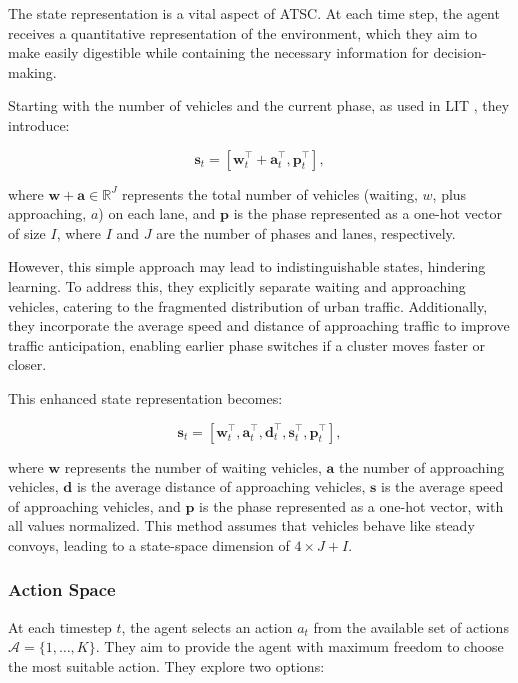 The state representation is a vital aspect of ATSC. At each time step, the agent receives a quantitative representation of the environment, which they aim to make easily digestible while containing the necessary information for decision-making.

Starting with the number of vehicles and the current phase, as used in LIT \cite{zheng2019diagnosing}, they introduce:

\[
\boldsymbol{s}_t = [ \boldsymbol{w}_t^\intercal + \boldsymbol{a}_t^\intercal , \boldsymbol{p}_t^\intercal ] ,
\]

where \(\boldsymbol{w} + \boldsymbol{a} \in \mathbb{R}^J\) represents the total number of vehicles (waiting, \(w\), plus approaching, \(a\)) on each lane, and \(\boldsymbol{p}\) is the phase represented as a one-hot vector of size \(I\), where \(I\) and \(J\) are the number of phases and lanes, respectively.

However, this simple approach may lead to indistinguishable states, hindering learning. To address this, they explicitly separate waiting and approaching vehicles, catering to the fragmented distribution of urban traffic. Additionally, they incorporate the average speed and distance of approaching traffic to improve traffic anticipation, enabling earlier phase switches if a cluster moves faster or closer.

This enhanced state representation becomes:

\[
\boldsymbol{s}_t = [\boldsymbol{w}_t^\intercal, \boldsymbol{a}_t^\intercal, \boldsymbol{d}_t^\intercal, \boldsymbol{s}_t^\intercal, \boldsymbol{p}_t^\intercal],
\]

where \(\boldsymbol{w}\) represents the number of waiting vehicles, \(\boldsymbol{a}\) the number of approaching vehicles, \(\boldsymbol{d}\) is the average distance of approaching vehicles, \(\boldsymbol{s}\) is the average speed of approaching vehicles, and \(\boldsymbol{p}\) is the phase represented as a one-hot vector, with all values normalized. This method assumes that vehicles behave like steady convoys, leading to a state-space dimension of \(4 \times J + I\).

\subsubsection{Action Space} \label{rlight_action_space}
\label{sec:action_space}

At each timestep \(t\), the agent selects an action \(a_t\) from the available set of actions \(\mathcal{A} = \{1, \ldots, K\}\). They aim to provide the agent with maximum freedom to choose the most suitable action. They explore two options:

